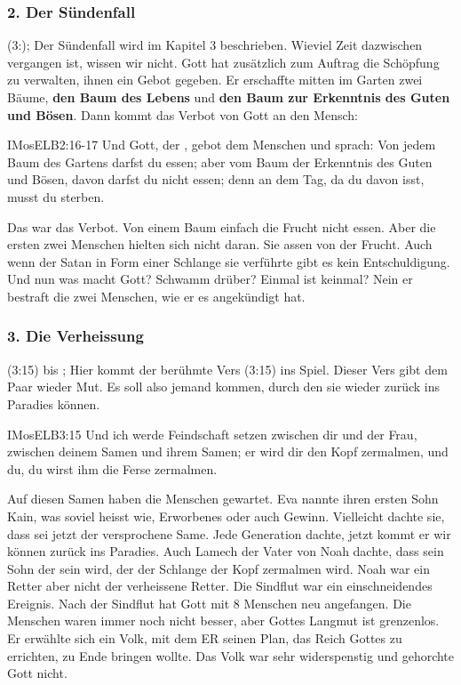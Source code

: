 \documentclass{mybib}
\begin{document}
    \subsubsection*{2. Der Sündenfall}
    (3:); Der Sündenfall wird im Kapitel 3 beschrieben. Wieviel Zeit dazwischen vergangen ist, wissen wir nicht. Gott hat zusätzlich zum Auftrag die Schöpfung zu verwalten, ihnen ein Gebot gegeben. Er erschaffte mitten im Garten zwei Bäume, \textbf{den Baum des Lebens} und \textbf{den Baum zur Erkenntnis des Guten und Bösen}. Dann kommt das Verbot von Gott an den Mensch:
    \begin{bibelbox}{IMos}{ELB}{2:16-17}
        Und Gott, der \herr{}, gebot dem Menschen und sprach: \flqq Von jedem Baum des Gartens darfst du essen; aber vom Baum der Erkenntnis des Guten und Bösen, davon darfst du nicht essen; denn an dem Tag, da du davon isst, musst du sterben.\frqq{}
    \end{bibelbox}
    Das war das Verbot. Von einem Baum einfach die Frucht nicht essen. Aber die ersten zwei Menschen hielten sich nicht daran. Sie assen von der Frucht. Auch wenn der Satan in Form einer Schlange sie verführte gibt es kein Entschuldigung. Und nun was macht Gott? Schwamm drüber? Einmal ist keinmal? Nein er bestraft die zwei Menschen, wie er es angekündigt hat. 
    \subsubsection*{3. Die Verheissung}
    (3:15) bis ; Hier kommt der berühmte Vers (3:15) ins Spiel. Dieser Vers gibt dem Paar wieder Mut. Es soll also jemand kommen, durch den sie wieder zurück ins Paradies können.
    \begin{bibelbox}{IMos}{ELB}{3:15}
        Und ich werde Feindschaft setzen zwischen dir und der Frau, zwischen deinem Samen und ihrem Samen; er wird dir den Kopf zermalmen, und du, du wirst ihm die Ferse zermalmen.
    \end{bibelbox}
    Auf diesen Samen haben die Menschen gewartet. Eva nannte ihren ersten Sohn Kain, was soviel heisst wie, Erworbenes oder auch Gewinn. Vielleicht dachte sie, dass sei jetzt der versprochene Same. Jede Generation dachte, jetzt kommt er wir können zurück ins Paradies. Auch Lamech der Vater von Noah dachte, dass sein Sohn der sein wird, der der Schlange der Kopf zermalmen wird. Noah war ein Retter aber nicht der verheissene Retter. Die Sindflut war ein einschneidendes Ereignis. Nach der Sindflut hat Gott mit 8 Menschen neu angefangen. Die Menschen waren immer noch  nicht besser, aber Gottes Langmut ist grenzenlos. Er erwählte sich ein Volk, mit dem ER seinen Plan, das Reich Gottes zu errichten, zu Ende bringen wollte. Das Volk war sehr widerspenstig und gehorchte Gott nicht. 
\end{document}
